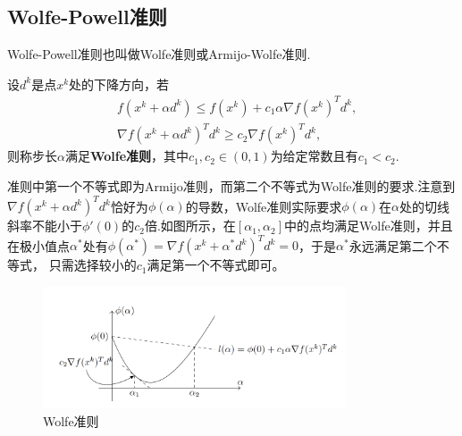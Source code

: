 \subsection{Wolfe-Powell准则}
Wolfe-Powell准则也叫做Wolfe准则或Armijo-Wolfe准则.
\begin{definition}[Wolfe准则]
	设$d^k$是点$x^k$处的下降方向，若
	\begin{equation}\label{wolfe}
		\begin{split}
			&f(x^k+\alpha d^k)\leq f(x^k) + c_1\alpha \nabla f(x^k)^T d^k,\\
			&\nabla f(x^k + \alpha d^k)^T d^k \geq c_2 \nabla f(x^k)^Td^k,
		\end{split}
	\end{equation}
	则称步长$\alpha$满足\textbf{Wolfe准则}，其中$c_1, c_2\in (0, 1)$为给定常数且有$c_1<c_2$.
\end{definition}
准则中第一个不等式即为Armijo准则，而第二个不等式为Wolfe准则的要求.注意到$\nabla f(x^k+\alpha d^k)^Td^k$恰好为$\phi(\alpha)$的导数，Wolfe准则实际要求$\phi(\alpha)$在$\alpha$处的切线斜率不能小于$\phi'(0)$的$c_2$倍.如图所示，在$[\alpha_1, \alpha_2]$中的点均满足Wolfe准则，并且在极小值点$\alpha^*$处有$\phi(\alpha^*) = \nabla f(x^k+\alpha^*d^k)^Td^k = 0$，于是$\alpha^*$永远满足第二个不等式， 只需选择较小的$c_1$满足第一个不等式即可。
\begin{figure}[h!]
\caption{Wolfe准则}
\centering
\includegraphics[width=0.8\textwidth]{img/wolfe.png}
\end{figure}
